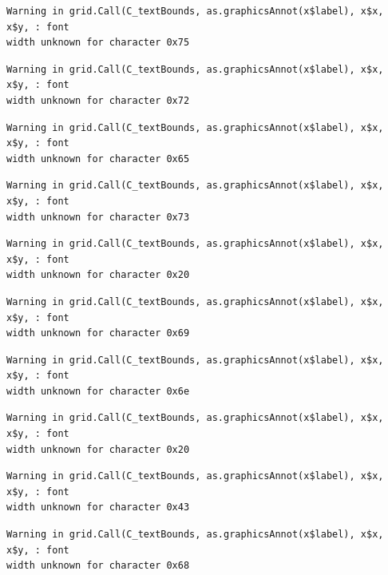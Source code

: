 \documentclass[
  letterpaper,
]{scrbook}
\begin{document}
\begin{verbatim}
Warning in grid.Call(C_textBounds, as.graphicsAnnot(x$label), x$x, x$y, : font
width unknown for character 0x75
\end{verbatim}

\begin{verbatim}
Warning in grid.Call(C_textBounds, as.graphicsAnnot(x$label), x$x, x$y, : font
width unknown for character 0x72
\end{verbatim}

\begin{verbatim}
Warning in grid.Call(C_textBounds, as.graphicsAnnot(x$label), x$x, x$y, : font
width unknown for character 0x65
\end{verbatim}

\begin{verbatim}
Warning in grid.Call(C_textBounds, as.graphicsAnnot(x$label), x$x, x$y, : font
width unknown for character 0x73
\end{verbatim}

\begin{verbatim}
Warning in grid.Call(C_textBounds, as.graphicsAnnot(x$label), x$x, x$y, : font
width unknown for character 0x20
\end{verbatim}

\begin{verbatim}
Warning in grid.Call(C_textBounds, as.graphicsAnnot(x$label), x$x, x$y, : font
width unknown for character 0x69
\end{verbatim}

\begin{verbatim}
Warning in grid.Call(C_textBounds, as.graphicsAnnot(x$label), x$x, x$y, : font
width unknown for character 0x6e
\end{verbatim}

\begin{verbatim}
Warning in grid.Call(C_textBounds, as.graphicsAnnot(x$label), x$x, x$y, : font
width unknown for character 0x20
\end{verbatim}

\begin{verbatim}
Warning in grid.Call(C_textBounds, as.graphicsAnnot(x$label), x$x, x$y, : font
width unknown for character 0x43
\end{verbatim}

\begin{verbatim}
Warning in grid.Call(C_textBounds, as.graphicsAnnot(x$label), x$x, x$y, : font
width unknown for character 0x68
\end{verbatim}
\end{document}
